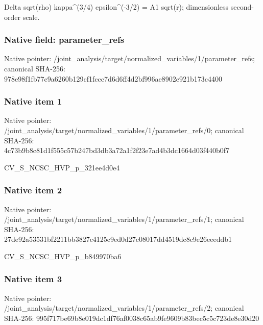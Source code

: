 \documentclass[10pt,a4paper]{article}
\begin{document}
\begingroup\raggedright\sloppy Delta sqrt(rho) kappa\textasciicircum{}(3/\allowbreak{}4) epsilon\textasciicircum{}(-3/\allowbreak{}2) =\allowbreak{} A1 sqrt(r);\allowbreak{} dimensionless second-order scale.\par\endgroup

\subsubsection{Native field: parameter\_\allowbreak{}refs}
Native pointer: /joint\_\allowbreak{}analysis/target/normalized\_\allowbreak{}variables/1/parameter\_\allowbreak{}refs; canonical SHA-256: 978e98f1fb77c9a6260b129cf1fccc7d6d6ff4d2bf996ae8902e921b173c4400

\subsubsection{Native item 1}
Native pointer: /joint\_\allowbreak{}analysis/target/normalized\_\allowbreak{}variables/1/parameter\_\allowbreak{}refs/0; canonical SHA-256: 4c73b9b8c81d1f555c57b247bd3db3a72a1f2f23e7ad4b3dc1664d03f440b0f7

\begingroup\raggedright\sloppy CV\_\allowbreak{}S\_\allowbreak{}NCSC\_\allowbreak{}HVP\_\allowbreak{}p\_\allowbreak{}321ee4d0e4\par\endgroup

\subsubsection{Native item 2}
Native pointer: /joint\_\allowbreak{}analysis/target/normalized\_\allowbreak{}variables/1/parameter\_\allowbreak{}refs/1; canonical SHA-256: 27de92a53531bf2211bb3827c4125c9ed0d27c08017dd4519dc8c9e26eeeddb1

\begingroup\raggedright\sloppy CV\_\allowbreak{}S\_\allowbreak{}NCSC\_\allowbreak{}HVP\_\allowbreak{}p\_\allowbreak{}b849970ba6\par\endgroup

\subsubsection{Native item 3}
Native pointer: /joint\_\allowbreak{}analysis/target/normalized\_\allowbreak{}variables/1/parameter\_\allowbreak{}refs/2; canonical SHA-256: 995f717be69b8e019dc1df76af0038c65ab9fe9609b83bec5c5c723de8e30d20
\end{document}
